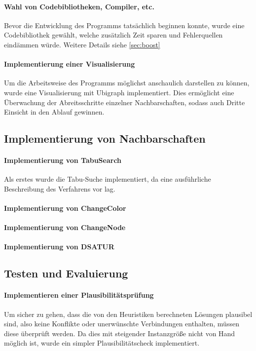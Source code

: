 \paragraph{Wahl von Codebibliotheken, Compiler, etc.}{Bevor die Entwicklung des Programms tatsächlich beginnen konnte, wurde eine Codebibliothek gewählt, welche zusätzlich Zeit sparen und Fehlerquellen eindämmen würde. Weitere Details siehe \ref{sec:boost}}
\paragraph{Implementierung einer Visualisierung}{Um die Arbeitsweise des Programms möglichst anschaulich darstellen zu können, wurde eine Visualisierung mit Ubigraph implementiert. Dies ermöglicht eine Überwachung der Abreitsschritte einzelner Nachbarschaften, sodass auch Dritte Einsicht in den Ablauf gewinnen.}

\subsection{Implementierung von Nachbarschaften}

\paragraph{Implementierung von TabuSearch}{Als erstes wurde die Tabu-Suche implementiert, da eine ausführliche Beschreibung des Verfahrens vor lag.} %
\paragraph{Implementierung von ChangeColor}{} %
\paragraph{Implementierung von ChangeNode}{} %
\paragraph{Implementierung von DSATUR}{}

\subsection{Testen und Evaluierung}

\paragraph{Implementieren einer Plausibilitätsprüfung}{Um sicher zu gehen, dass die von den Heuristiken berechneten Lösungen plausibel sind, also keine Konflikte oder unerwünschte Verbindungen enthalten, müssen diese überprüft werden. Da dies mit steigender Instanzgröße nicht von Hand möglich ist, wurde ein simpler Plausibilitätscheck implementiert.}
